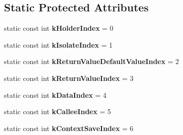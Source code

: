 \subsection*{Static Protected Attributes}
\begin{DoxyCompactItemize}
\item 
\hypertarget{classv8_1_1_function_callback_info_a073824921daf8600fb9c00c50ee8ef0c}{}static const int {\bfseries k\+Holder\+Index} = 0\label{classv8_1_1_function_callback_info_a073824921daf8600fb9c00c50ee8ef0c}

\item 
\hypertarget{classv8_1_1_function_callback_info_a0e2fbe5a323276263c848ea8050a34eb}{}static const int {\bfseries k\+Isolate\+Index} = 1\label{classv8_1_1_function_callback_info_a0e2fbe5a323276263c848ea8050a34eb}

\item 
\hypertarget{classv8_1_1_function_callback_info_a0b32b5613fe2f0cd139d9dffc0916d09}{}static const int {\bfseries k\+Return\+Value\+Default\+Value\+Index} = 2\label{classv8_1_1_function_callback_info_a0b32b5613fe2f0cd139d9dffc0916d09}

\item 
\hypertarget{classv8_1_1_function_callback_info_abb339e201184ebe2502a1202d54201ca}{}static const int {\bfseries k\+Return\+Value\+Index} = 3\label{classv8_1_1_function_callback_info_abb339e201184ebe2502a1202d54201ca}

\item 
\hypertarget{classv8_1_1_function_callback_info_a152c34c5b2f8c55d04d6d541bf8a4544}{}static const int {\bfseries k\+Data\+Index} = 4\label{classv8_1_1_function_callback_info_a152c34c5b2f8c55d04d6d541bf8a4544}

\item 
\hypertarget{classv8_1_1_function_callback_info_a08a4ef2004bfaa468df347d357849ca6}{}static const int {\bfseries k\+Callee\+Index} = 5\label{classv8_1_1_function_callback_info_a08a4ef2004bfaa468df347d357849ca6}

\item 
\hypertarget{classv8_1_1_function_callback_info_a9c0fdcc74eea99d8fa74460086e3b80a}{}static const int {\bfseries k\+Context\+Save\+Index} = 6\label{classv8_1_1_function_callback_info_a9c0fdcc74eea99d8fa74460086e3b80a}

\end{DoxyCompactItemize}
